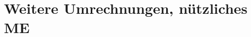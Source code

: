 \documentclass[numerate]{cheatsheet}
\begin{document}
%     
%     
%     
%     
%     

%     
%     
%     
%     
%     
%     

%     

\section{Weitere Umrechnungen, nützliches \hfill ME}
    
    
    
\end{document}
